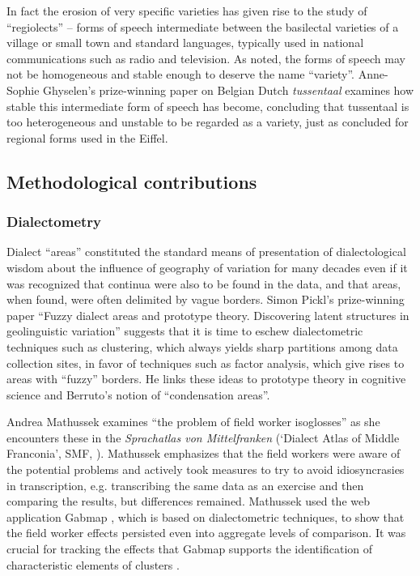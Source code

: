 \documentclass[output=paper]{LSP/langsci}
\begin{document}
In fact the erosion of very specific varieties has given rise to the study of “regiolects” \citep{auer_convergence_1996} – forms of speech intermediate between the basilectal varieties of a village or small town and standard languages, typically used in national communications such as radio and television. As \citet[22]{auer_europes_2005} noted, the forms of speech may not be homogeneous and stable enough to deserve the name “variety”.  Anne-Sophie Ghyselen’s prize-winning paper on Belgian Dutch \textit{tussentaal} examines how stable this intermediate form of speech has become, concluding that tussentaal is too heterogeneous and unstable to be regarded as a variety, just as \citet{lenz_struktur_2003} concluded for regional forms used in the Eiffel.

\subsection{Methodological contributions}

\subsubsection{Dialectometry}
Dialect “areas” constituted the standard means of presentation of dialectological wisdom about the influence of geography of variation for many decades even if it was recognized that continua were also to be found in the data, and that areas, when found, were often delimited by vague borders. Simon Pickl’s prize-winning paper “Fuzzy dialect areas and prototype theory. Discovering latent structures in geolinguistic variation” suggests that it is time to eschew dialectometric techniques such as clustering, which always yields sharp partitions among data collection sites, in favor of techniques such as factor analysis, which give rises to areas with “fuzzy” borders.  He links these ideas to prototype theory in cognitive science and Berruto’s notion of “condensation areas”. 

Andrea Mathussek examines “the problem of field worker isoglosses” as she encounters these in the \textit{Sprachatlas von Mittelfranken} (‘Dialect Atlas of Middle Franconia’, SMF, \citealt{munske_handbuch_2013}). Mathussek emphasizes that the field workers were aware of the potential problems and actively took measures to try to avoid idiosyncrasies in transcription, e.g. transcribing the same data as an exercise and then comparing the results, but differences remained. Mathussek used the web application Gabmap \citep{nerbonne_gabmap_2011}, which is based on dialectometric techniques, to show that the field worker effects persisted even into aggregate levels of comparison. It was crucial for tracking the effects that Gabmap supports the identification of characteristic elements of clusters \citep{prokic_detecting_2012}. 
\end{document}
